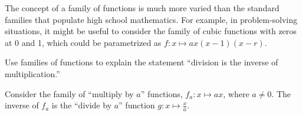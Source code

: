 \documentclass[space,handout,nooutcomes]{ximera}
\newcommand{\Z}{\mathbb Z}
\begin{document}
The concept of a family of functions is much more varied than the standard families that populate high school mathematics.  For example, in problem-solving situations, it might be useful to consider the family of cubic functions with zeros at 0 and 1, which could be parametrized as $f:x\mapsto ax(x-1)(x-r)$.  

\begin{question}
Use families of functions to explain the statement ``division is the inverse of multiplication.''  
\begin{freeResponse}
\begin{hint}
Consider the family of ``multiply by $a$'' functions, $f_a:x\mapsto ax$, where $a\neq 0$.  The inverse of $f_a$ is the ``divide by $a$'' function $g:x\mapsto \frac{x}{a}$.   
\end{hint}
\end{freeResponse}
\end{question}



%
%



%
\end{document}

